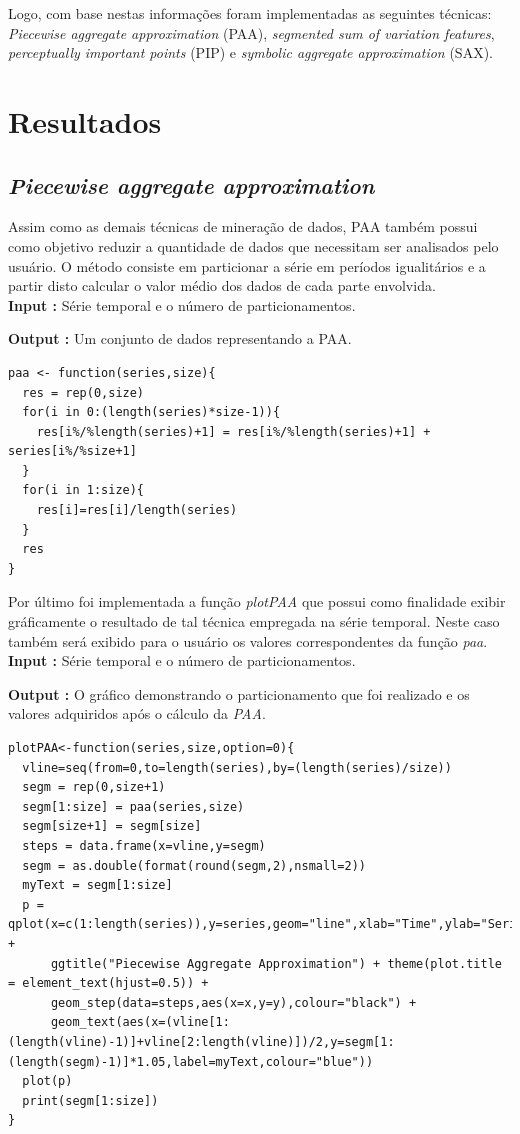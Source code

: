 \documentclass[12pt,letterpaper]{article}
\begin{document}
Logo, com base nestas informações foram implementadas as seguintes técnicas: \textit{Piecewise aggregate approximation} (PAA), \textit{segmented sum of variation features}, \textit{perceptually important points} (PIP) e \textit{symbolic aggregate approximation} (SAX).

\section{Resultados}

\subsection{\textit{Piecewise aggregate approximation}}

Assim como as demais técnicas de mineração de dados, PAA também possui como objetivo reduzir a quantidade de dados que necessitam ser analisados pelo usuário. O método consiste em particionar a série em períodos igualitários e a partir disto calcular o valor médio dos dados de cada parte envolvida.\\

\textbf{Input :} Série temporal e o número de particionamentos.

\textbf{Output :} Um conjunto de dados representando a PAA.\\

\begin{lstlisting}
paa <- function(series,size){
  res = rep(0,size)
  for(i in 0:(length(series)*size-1)){
    res[i%/%length(series)+1] = res[i%/%length(series)+1] + series[i%/%size+1]
  }
  for(i in 1:size){
    res[i]=res[i]/length(series)
  }
  res
}
\end{lstlisting}

Por último foi implementada a função \textit{plotPAA} que possui como finalidade exibir gráficamente o resultado de tal técnica empregada na série temporal. Neste caso também será exibido para o usuário os valores correspondentes da função \textit{paa}.\\

\textbf{Input :} Série temporal e o número de particionamentos.

\textbf{Output :} O gráfico demonstrando o particionamento que foi realizado e os valores adquiridos após o cálculo da \textit{PAA}.\\

\begin{lstlisting}
plotPAA<-function(series,size,option=0){
  vline=seq(from=0,to=length(series),by=(length(series)/size))
  segm = rep(0,size+1)
  segm[1:size] = paa(series,size)
  segm[size+1] = segm[size]
  steps = data.frame(x=vline,y=segm)
  segm = as.double(format(round(segm,2),nsmall=2))
  myText = segm[1:size]
  p = qplot(x=c(1:length(series)),y=series,geom="line",xlab="Time",ylab="Serie",colour="red") +
      ggtitle("Piecewise Aggregate Approximation") + theme(plot.title = element_text(hjust=0.5)) +
      geom_step(data=steps,aes(x=x,y=y),colour="black") +
      geom_text(aes(x=(vline[1:(length(vline)-1)]+vline[2:length(vline)])/2,y=segm[1:(length(segm)-1)]*1.05,label=myText,colour="blue"))
  plot(p)
  print(segm[1:size])
}
\end{lstlisting}
\end{document}
